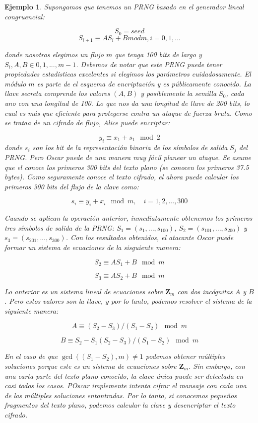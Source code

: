 \documentclass{llncs}
\theoremstyle{plane}
\newtheorem{ej}{Ejemplo}
\begin{document}
\begin{ej}
Supongamos que tenemos un PRNG basado en el generador lineal congruencial:

\[S_{0}=seed\]   
\[ S_{i+1} \equiv AS_{i} + B mod m, i = 0, 1,... \]


donde nosotros elegimos un flujo $m$ que tenga 100 bits de largo y $S_{i}, A, B \in {0,1,...,m-1}$. Debemos de notar que este PRNG puede tener propiedades estadisticas excelentes si elegimos los parámetros cuidadosamente. El módulo $m$ es parte de el esquema de encriptación y es públicamente conocido. La llave secreta comprende los valores $(A,B)$ y posiblemente la semilla $S_{0}$, cada uno con una longitud de 100. Lo que nos da una longitud de llave de 200 bits, lo cual es más que eficiente para protegerse contra un ataque de fuerza bruta. Como se trataa de un cifrado de flujo, Alice puede encriptar:

\[y_{i} \equiv x_{1}+ s_{1} \mod{2} \]
donde $s_{i}$ son los bit de la representación binaria de los símbolos de salida $S_{j}$ del PRNG.
Pero Oscar puede de una manera muy fácil planear un ataque. Se asume que el conoce los primeros 300 bits del texto plano (se conocen los primeros 37.5 bytes). Como seguramente conoce el texto cifrado, el ahora puede calcular los primeros 300 bits del flujo de la clave como:
 
\[s_{i} \equiv y_{i}+ x_{i} \mod{m}, \quad i = 1, 2, ..., 300 \]

Cuando se aplican la operación anterior, inmediatamente obtenemos los primeros tres símbolos de salida de la PRNG: $S_{1}= (s_{1}, ..., s_{100})$, $S_{2}= (s_{101}, ..., s_{200})$ y $s_{3}= (s_{201}, ... , s_{300})$. Con los resultados obtenidos, el atacante Oscar puede formar un sistema de ecuaciones de la sisguiente manera:

\[S_{2} \equiv  AS_{1}+ B \mod{m}  \]

\[S_{3} \equiv  AS_{2}+ B \mod{m}  \]

Lo anterior es un sistema lineal de ecuaciones sobre $\mathbf{Z}_{m}$ con dos incógnitas $A$ y $B$. Pero estos valores son la llave, y por lo tanto, podemos resolver el sistema de la siguiente manera:

\[A \equiv  (S_{2}- S_{3})/ (S_{1}- S_{2})   \mod{m}  \]

\[B \equiv   S_{2} - S_{1} (S_{2}- S_{3})/ (S_{1}- S_{2})  \mod{m}  \]


En el caso de que $\gcd ((S_{1}-S_{2}),m) \neq 1$ podemos obtener múltiples soluciones porque este es un sistema de ecuaciones sobre $ \mathbf{Z}_{m}$. Sin embargo, con una carta parte del texto plano conocido, la clave única puede ser detectada en casi todos los casos. POscar implemente intenta cifrar el mansaje con cada una de las múltiples soluciones entontradas.  Por lo tanto, si conocemos pequeños fragmentos del texto plano, podemos calcular la clave y desencriptar el texto cifrado.


\end{ej}
\end{document}
